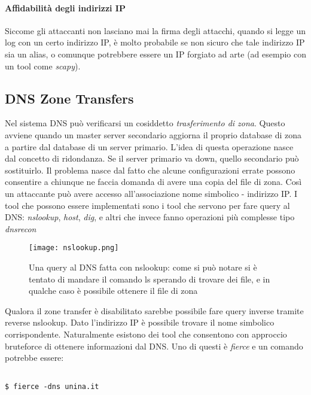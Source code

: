 \documentclass[14pt]{extreport}
\begin{document}
\paragraph{Affidabilità degli indirizzi IP}
Siccome gli attaccanti non lasciano mai la firma degli attacchi, quando si legge un log con un certo indirizzo IP, è molto probabile se non sicuro che tale indirizzo IP sia un alias, o comunque potrebbere essere un IP forgiato ad arte (ad esempio con un tool come \textit{scapy}).

\subsection{DNS Zone Transfers}

Nel sistema DNS può verificarsi un cosiddetto \textit{trasferimento di zona}. Questo avviene quando un master server secondario aggiorna il proprio database di zona a partire dal database di un server primario. L'idea di questa operazione nasce dal concetto di ridondanza. Se il server primario va down, quello secondario può sostituirlo.
Il problema nasce dal fatto che alcune configurazioni errate possono consentire a chiunque ne faccia domanda di avere una copia del file di zona. Così un attaccante può avere accesso all'associazione nome simbolico - indirizzo IP.
I tool che possono essere implementati sono i tool che servono per fare query al DNS: \textit{nslookup}, \textit{host}, \textit{dig}, e altri che invece fanno operazioni più complesse tipo \textit{dnsrecon}

\begin{figure}[H]
    \centering
    \texttt{[image: nslookup.png]}
    \caption{Una query al DNS fatta con nslookup: come si può notare si è tentato di mandare il comando ls sperando di trovare dei file, e in qualche caso è possibile ottenere il file di zona}
\end{figure}

Qualora il zone transfer è disabilitato sarebbe possibile fare query inverse tramite reverse nslookup. Dato l'indirizzo IP è possibile trovare il nome simbolico corrispondente. Naturalmente esistono dei tool che consentono con approccio bruteforce di ottenere informazioni dal DNS. Uno di questi è \textit{fierce} e un comando potrebbe essere:

\vspace{5pt}

{
\small
\begin{tcolorbox}

\begin{verbatim}

$ fierce -dns unina.it
  
\end{verbatim}

\end{tcolorbox}
}
\end{document}

